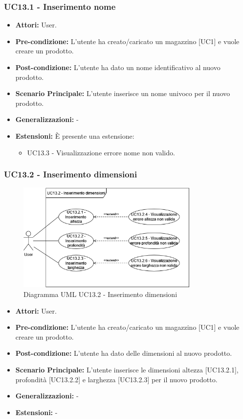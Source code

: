 \subsubsection{UC13.1 - Inserimento nome}
\begin{itemize}
    \item \textbf{Attori:} User.
    \item \textbf{Pre-condizione:}  L'utente ha creato/caricato un magazzino [UC1] e vuole creare un prodotto.
    \item \textbf{Post-condizione:} L'utente ha dato un nome identificativo al nuovo prodotto.
    \item \textbf{Scenario Principale:}  L'utente inserisce un nome univoco per il nuovo prodotto.
    \item \textbf{Generalizzazioni:} -
    \item \textbf{Estensioni:} È presente una estensione:
    \begin{itemize}
        \item UC13.3 - Visualizzazione errore nome non valido.
    \end{itemize}
\end{itemize}


\subsubsection{UC13.2 - Inserimento dimensioni}
\begin{figure}[H]
  \centering
  \includegraphics[width=0.8\textwidth]{UC_diagrams_11-20/UC13.2.drawio.png}
   \caption{Diagramma UML UC13.2 - Inserimento dimensioni}
\end{figure}
\begin{itemize}
    \item \textbf{Attori:} User.
    \item \textbf{Pre-condizione:}  L'utente ha creato/caricato un magazzino [UC1] e vuole creare un prodotto.
    \item \textbf{Post-condizione:} L'utente ha dato delle dimensioni al nuovo prodotto.
    \item \textbf{Scenario Principale:}  L'utente inserisce le dimensioni altezza [UC13.2.1], profondità [UC13.2.2] e larghezza [UC13.2.3] per il nuovo prodotto.
    \item \textbf{Generalizzazioni:} -
    \item \textbf{Estensioni:} -
\end{itemize}


